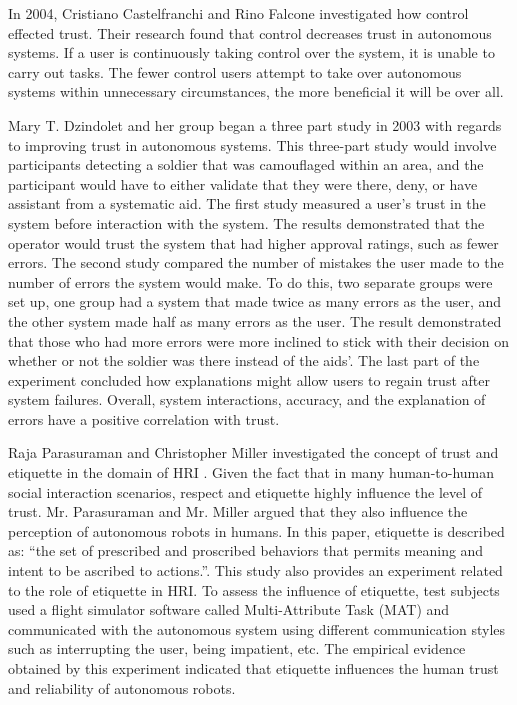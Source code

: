 \documentclass[runningheads,a4paper]{llncs}
\begin{document}
In 2004, Cristiano Castelfranchi and Rino Falcone investigated how control effected trust\cite{castelfranchi2000trust}.  Their research found that control decreases trust in autonomous systems.  If a user is continuously taking control over the system, it is unable to carry out tasks.  The fewer control users attempt to take over autonomous systems within unnecessary circumstances, the more beneficial it will be over all. 

Mary T. Dzindolet and her group began a three part study in 2003  with regards to improving trust in autonomous systems\cite{dzindolet2003role}.  This three-part study would involve participants detecting a soldier that was camouflaged within an area, and the participant would have to either validate that they were there, deny, or have assistant from a systematic aid.  The first study measured a user's trust in the system before interaction with the system.  The results demonstrated that the operator would trust the system that had higher approval ratings, such as fewer errors.  The second study compared the number of mistakes the user made to the number of errors the system would make.  To do this, two separate groups were set up,  one group had a system that made twice as many errors as the user, and the other system made half as many errors as the user.  The result demonstrated that those who had more errors were more inclined to stick with their decision on whether or not the soldier was there instead of the aids'.  The last part of the experiment concluded how explanations might allow users to regain trust after system failures.   Overall, system interactions, accuracy, and the explanation of errors have a positive correlation with trust.

Raja Parasuraman and Christopher Miller investigated the concept of trust and etiquette in the domain of HRI \cite{parasuraman2004trust}. Given the fact that in many human-to-human social interaction scenarios, respect and etiquette highly influence the level of trust. Mr. Parasuraman and Mr. Miller argued that they also influence the perception of autonomous robots in humans. In this paper, etiquette is described as: ``the set of prescribed and proscribed behaviors
that permits meaning and intent to be ascribed to
actions.''. This study also provides an experiment related to the role of etiquette in HRI. To assess the influence of etiquette, test subjects used a flight simulator software called Multi-Attribute Task (MAT) and communicated with the autonomous system using different communication styles such as interrupting the user, being impatient, etc. The empirical evidence obtained by this experiment indicated that etiquette influences the human trust and reliability of autonomous robots.
\end{document}
